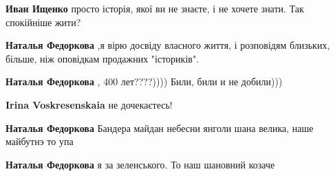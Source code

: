 \begin{itemize}
\begin{itemize}
\begin{itemize}
 
\textbf{Иван Ищенко} просто історія, якої ви не знаєте, і не хочете знати. Так спокійніше жити?

 
\textbf{Наталья Федоркова} ,я вірю досвіду власного життя, і розповідям близьких, більше, ніж оповідкам продажних "істориків".

 
\textbf{Наталья Федоркова} , 400 лет????)))) Били, били и не добили)))\Laughey[1.0][white]\Laughey[1.0][white]\Laughey[1.0][white]

 
\textbf{Irina Voskresenskaia} не дочекаєтесь!

 
\textbf{Наталья Федоркова} Бандера майдан небесни янголи шана велика, наше майбутнэ то упа

 
\textbf{Наталья Федоркова} я за зеленського. То наш шановний козаче


\end{itemize}
\end{itemize}
\end{itemize}
